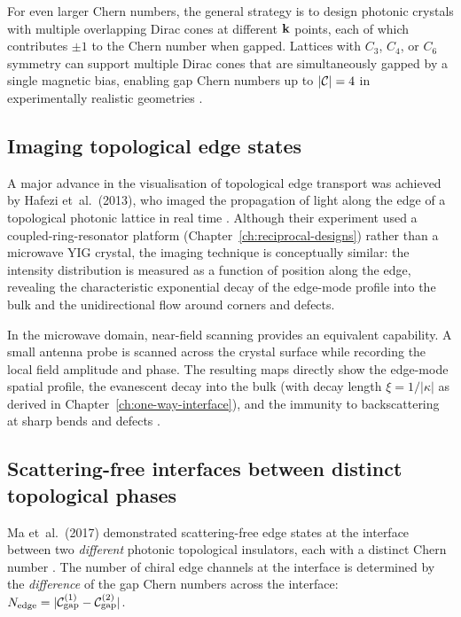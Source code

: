For even larger Chern numbers, the general strategy is to design
photonic crystals with multiple overlapping Dirac cones at different
$\mathbf{k}$ points, each of which contributes $\pm 1$ to the Chern number
when gapped.  Lattices with $C_3$, $C_4$, or $C_6$ symmetry can
support multiple Dirac cones that are simultaneously gapped by a
single magnetic bias, enabling gap Chern numbers up to $|\mathcal{C}|=4$
in experimentally realistic geometries
\cite{ozawa2018topological,skirlo2015experimental}.

\subsection{Imaging topological edge states}
\label{sec:ch9-imaging}

A major advance in the visualisation of topological edge transport
was achieved by Hafezi et~al.\ (2013), who imaged the propagation of
light along the edge of a topological photonic lattice in real time
\cite{hafezi2013imaging}.  Although their experiment used a
coupled-ring-resonator platform (Chapter~\ref{ch:reciprocal-designs})
rather than a microwave YIG crystal, the imaging technique is
conceptually similar: the intensity distribution is measured as a
function of position along the edge, revealing the characteristic
exponential decay of the edge-mode profile into the bulk and the
unidirectional flow around corners and defects.

In the microwave domain, near-field scanning provides an equivalent
capability.  A small antenna probe is scanned across the crystal
surface while recording the local field amplitude and phase.  The
resulting maps directly show the edge-mode spatial profile, the
evanescent decay into the bulk (with decay length $\xi = 1/|\kappa|$
as derived in Chapter~\ref{ch:one-way-interface}), and the immunity
to backscattering at sharp bends and defects
\cite{hafezi2013imaging,wang2007reflection}.

\subsection{Scattering-free interfaces between distinct topological phases}
\label{sec:ch9-hetero-interface}

Ma et~al.\ (2017) demonstrated scattering-free edge states at the
interface between two \emph{different} photonic topological insulators,
each with a distinct Chern number \cite{ma2017scattering}.  The number
of chiral edge channels at the interface is determined by the
\emph{difference} of the gap Chern numbers across the interface:
$N_{\mathrm{edge}} = |\mathcal{C}_{\mathrm{gap}}^{(1)} -
\mathcal{C}_{\mathrm{gap}}^{(2)}|$.

